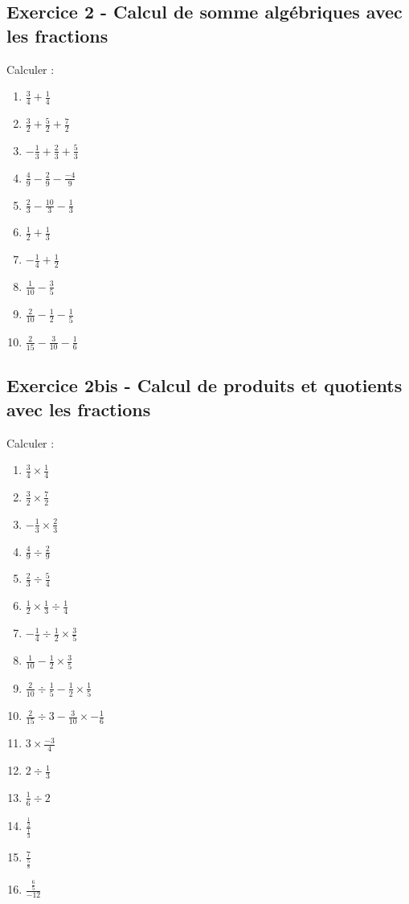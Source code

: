 \documentclass[14 pt]{extarticle}
\renewcommand\it\item
\theoremstyle{plain}
\begin{document}
  \subsection*{Exercice 2 - Calcul de somme algébriques avec les fractions}
  Calculer : 
  \begin{enumerate}
  \item $\displaystyle\frac34 + \frac14$
  \item $\displaystyle\frac32 + \frac52 + \frac72$
  \it $\displaystyle-\frac13 + \frac23 + \frac53$
  \it $\displaystyle\frac49 - \frac29 - \frac{-4}9$
  \it $\displaystyle\frac23 - \frac{10}3 - \frac{1}3$
  \it $\displaystyle\frac12 + \frac13$
  \it $\displaystyle-\frac14 + \frac12$
  \it $\displaystyle\frac1{10} - \frac35$
  \it $\displaystyle\frac2{10} - \frac12 - \frac15$
  \it $\displaystyle\frac2{15} - \frac3{10} - \frac16$
  \end{enumerate}
  \subsection*{Exercice 2bis - Calcul de produits et quotients avec les fractions}
    Calculer : 
  \begin{enumerate}
  \item $\displaystyle\frac34 \times \frac14$
  \item $\displaystyle\frac32 \times\frac72$
  \it $\displaystyle-\frac13 \times \frac23 $
  \it $\displaystyle\frac49 \div \frac29 $
  \it $\displaystyle\frac23 \div \frac54$
  \it $\displaystyle\frac12 \times \frac13\div \frac14$
  \it $\displaystyle-\frac14 \div  \frac12 \times \frac35$
  \it $\displaystyle\frac1{10} - \frac12\times \frac35$
  \it $\displaystyle\frac2{10}\div\frac15 - \frac12 \times \frac15$
  \it $\displaystyle\frac2{15}\div 3 - \frac3{10} \times - \frac16$
  \it $\displaystyle3\times \frac{-3}4$
  \it $\displaystyle2\div \frac13$
  \it $\displaystyle\frac16\div2$
  \it $\displaystyle\frac{\frac12}{\frac13}$
  \it $\displaystyle\frac{7}{\frac58}$
  \it $\displaystyle\frac{\frac65}{-12}$
  \end{enumerate}
  
\end{document}
